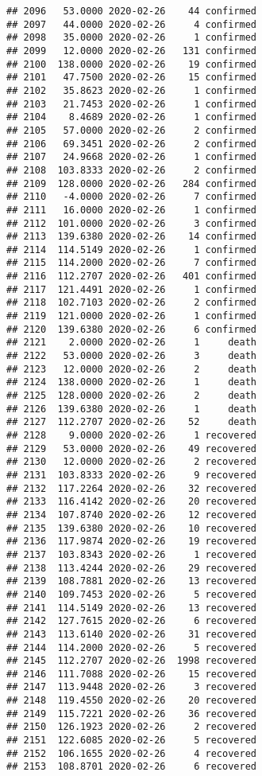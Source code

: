 \documentclass[
]{article}
\begin{document}
\begin{verbatim}
## 2096   53.0000 2020-02-26    44 confirmed
## 2097   44.0000 2020-02-26     4 confirmed
## 2098   35.0000 2020-02-26     1 confirmed
## 2099   12.0000 2020-02-26   131 confirmed
## 2100  138.0000 2020-02-26    19 confirmed
## 2101   47.7500 2020-02-26    15 confirmed
## 2102   35.8623 2020-02-26     1 confirmed
## 2103   21.7453 2020-02-26     1 confirmed
## 2104    8.4689 2020-02-26     1 confirmed
## 2105   57.0000 2020-02-26     2 confirmed
## 2106   69.3451 2020-02-26     2 confirmed
## 2107   24.9668 2020-02-26     1 confirmed
## 2108  103.8333 2020-02-26     2 confirmed
## 2109  128.0000 2020-02-26   284 confirmed
## 2110   -4.0000 2020-02-26     7 confirmed
## 2111   16.0000 2020-02-26     1 confirmed
## 2112  101.0000 2020-02-26     3 confirmed
## 2113  139.6380 2020-02-26    14 confirmed
## 2114  114.5149 2020-02-26     1 confirmed
## 2115  114.2000 2020-02-26     7 confirmed
## 2116  112.2707 2020-02-26   401 confirmed
## 2117  121.4491 2020-02-26     1 confirmed
## 2118  102.7103 2020-02-26     2 confirmed
## 2119  121.0000 2020-02-26     1 confirmed
## 2120  139.6380 2020-02-26     6 confirmed
## 2121    2.0000 2020-02-26     1     death
## 2122   53.0000 2020-02-26     3     death
## 2123   12.0000 2020-02-26     2     death
## 2124  138.0000 2020-02-26     1     death
## 2125  128.0000 2020-02-26     2     death
## 2126  139.6380 2020-02-26     1     death
## 2127  112.2707 2020-02-26    52     death
## 2128    9.0000 2020-02-26     1 recovered
## 2129   53.0000 2020-02-26    49 recovered
## 2130   12.0000 2020-02-26     2 recovered
## 2131  103.8333 2020-02-26     9 recovered
## 2132  117.2264 2020-02-26    32 recovered
## 2133  116.4142 2020-02-26    20 recovered
## 2134  107.8740 2020-02-26    12 recovered
## 2135  139.6380 2020-02-26    10 recovered
## 2136  117.9874 2020-02-26    19 recovered
## 2137  103.8343 2020-02-26     1 recovered
## 2138  113.4244 2020-02-26    29 recovered
## 2139  108.7881 2020-02-26    13 recovered
## 2140  109.7453 2020-02-26     5 recovered
## 2141  114.5149 2020-02-26    13 recovered
## 2142  127.7615 2020-02-26     6 recovered
## 2143  113.6140 2020-02-26    31 recovered
## 2144  114.2000 2020-02-26     5 recovered
## 2145  112.2707 2020-02-26  1998 recovered
## 2146  111.7088 2020-02-26    15 recovered
## 2147  113.9448 2020-02-26     3 recovered
## 2148  119.4550 2020-02-26    20 recovered
## 2149  115.7221 2020-02-26    36 recovered
## 2150  126.1923 2020-02-26     2 recovered
## 2151  122.6085 2020-02-26     5 recovered
## 2152  106.1655 2020-02-26     4 recovered
## 2153  108.8701 2020-02-26     6 recovered

\end{verbatim}
\end{document}

